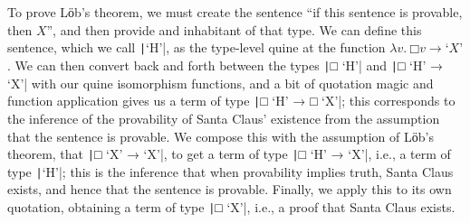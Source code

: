 \begin{code}
\\
\>[0]\<[2]%
\>[2]      \AgdaSymbol{=}     \AgdaSymbol{(}   \AgdaSymbol{)}\<%
\\
\>[0]\<[2]%
\>[2]    \AgdaSymbol{=}   \<%
\\
\>[0]\<[2]%
\>[2]    \AgdaSymbol{=}   \<%
\\
\>[0]\<[2]%
\>[2]     \AgdaSymbol{=}    \AgdaSymbol{(} \AgdaSymbol{)}\<%
\\
\>[0]\<[2]%
\>[2]     \AgdaSymbol{=}    \AgdaSymbol{(} \AgdaSymbol{)}\<%
\\
\>[0]\<[2]%
\>[2]     \<%
\\
\>[2]\<[4]%
\>[4]\AgdaSymbol{=}  \AgdaSymbol{(} \AgdaSymbol{(}   \AgdaSymbol{)}   \AgdaSymbol{(}   \AgdaSymbol{))}\<%
\end{code}

 To prove Lӧb's theorem, we must create the sentence ``if this
 sentence is provable, then $X$'', and then provide and inhabitant of
 that type.  We can define this sentence, which we call
 \texttt|‘H’|, as the type-level quine at the function
 $\lambda v.\ □ v → ‘X’$.  We can then convert back and forth between
 the types \texttt|□ ‘H’| and \texttt|□ ‘H’ → ‘X’|
 with our quine isomorphism functions, and a bit of quotation magic
 and function application gives us a term of type
 \texttt|□ ‘H’ → □ ‘X’|; this corresponds to the inference
 of the provability of Santa Claus' existence from the assumption that
 the sentence is provable.  We compose this with the assumption of
 Lӧb's theorem, that \texttt|□ ‘X’ → ‘X’|, to get a term of
 type \texttt|□ ‘H’ → ‘X’|, i.e., a term of type
 \texttt|‘H’|; this is the inference that when provability
 implies truth, Santa Claus exists, and hence that the sentence is
 provable.  Finally, we apply this to its own quotation, obtaining a
 term of type \texttt|□ ‘X’|, i.e., a proof that Santa Claus
 exists.

